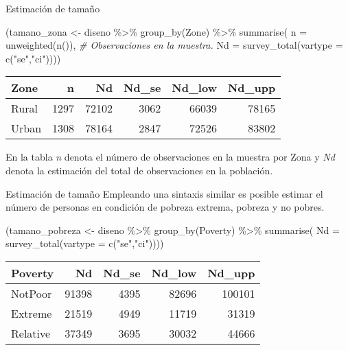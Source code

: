 \documentclass[
  ignorenonframetext,
]{beamer}
\newenvironment{Shaded}{\begin{snugshade}}{\end{snugshade}}
\newcommand{\AttributeTok}[1]{\textcolor[rgb]{0.77,0.63,0.00}{#1}}
\newcommand{\CommentTok}[1]{\textcolor[rgb]{0.56,0.35,0.01}{\textit{#1}}}
\newcommand{\FunctionTok}[1]{\textcolor[rgb]{0.00,0.00,0.00}{#1}}
\newcommand{\NormalTok}[1]{#1}
\newcommand{\OtherTok}[1]{\textcolor[rgb]{0.56,0.35,0.01}{#1}}
\newcommand{\SpecialCharTok}[1]{\textcolor[rgb]{0.00,0.00,0.00}{#1}}
\newcommand{\StringTok}[1]{\textcolor[rgb]{0.31,0.60,0.02}{#1}}
\begin{document}
\begin{frame}[fragile]{Estimación de tamaño}
\protect\hypertarget{estimaciuxf3n-de-tamauxf1o}{}
\begin{Shaded}
\begin{Highlighting}[]
\NormalTok{(tamano\_zona }\OtherTok{\textless{}{-}}\NormalTok{ diseno }\SpecialCharTok{\%\textgreater{}\%} \FunctionTok{group\_by}\NormalTok{(Zone) }\SpecialCharTok{\%\textgreater{}\%} 
   \FunctionTok{summarise}\NormalTok{(}
     \AttributeTok{n =} \FunctionTok{unweighted}\NormalTok{(}\FunctionTok{n}\NormalTok{()), }\CommentTok{\# Observaciones en la muestra.}
     \AttributeTok{Nd =} \FunctionTok{survey\_total}\NormalTok{(}\AttributeTok{vartype =} \FunctionTok{c}\NormalTok{(}\StringTok{"se"}\NormalTok{,}\StringTok{"ci"}\NormalTok{))))}
\end{Highlighting}
\end{Shaded}

\begin{longtable}[]{@{}lrrrrr@{}}
\toprule
Zone & n & Nd & Nd\_se & Nd\_low & Nd\_upp \\
\midrule
\endhead
Rural & 1297 & 72102 & 3062 & 66039 & 78165 \\
Urban & 1308 & 78164 & 2847 & 72526 & 83802 \\
\bottomrule
\end{longtable}

En la tabla \emph{n} denota el número de observaciones en la muestra por
Zona y \emph{Nd} denota la estimación del total de observaciones en la
población.
\end{frame}

\begin{frame}[fragile]{Estimación de tamaño}
\protect\hypertarget{estimaciuxf3n-de-tamauxf1o-1}{}
Empleando una sintaxis similar es posible estimar el número de personas
en condición de pobreza extrema, pobreza y no pobres.

\begin{Shaded}
\begin{Highlighting}[]
\NormalTok{(tamano\_pobreza }\OtherTok{\textless{}{-}}\NormalTok{ diseno }\SpecialCharTok{\%\textgreater{}\%} \FunctionTok{group\_by}\NormalTok{(Poverty) }\SpecialCharTok{\%\textgreater{}\%} 
   \FunctionTok{summarise}\NormalTok{(}
       \AttributeTok{Nd =} \FunctionTok{survey\_total}\NormalTok{(}\AttributeTok{vartype =} \FunctionTok{c}\NormalTok{(}\StringTok{"se"}\NormalTok{,}\StringTok{"ci"}\NormalTok{))))}
\end{Highlighting}
\end{Shaded}

\begin{longtable}[]{@{}lrrrr@{}}
\toprule
Poverty & Nd & Nd\_se & Nd\_low & Nd\_upp \\
\midrule
\endhead
NotPoor & 91398 & 4395 & 82696 & 100101 \\
Extreme & 21519 & 4949 & 11719 & 31319 \\
Relative & 37349 & 3695 & 30032 & 44666 \\
\bottomrule
\end{longtable}
\end{frame}
\end{document}
